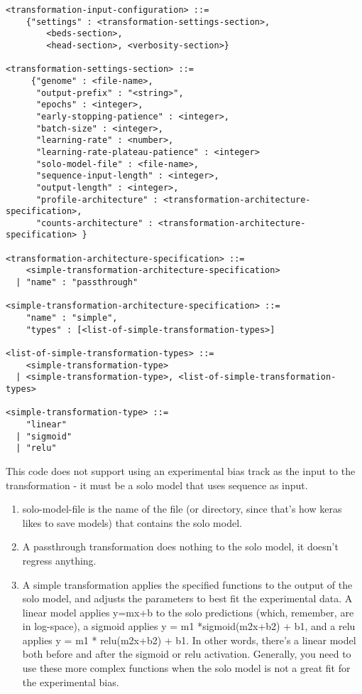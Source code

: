 \documentclass{article}
\begin{document}
\begin{lstlisting}
<transformation-input-configuration> ::=
    {"settings" : <transformation-settings-section>, 
        <beds-section>, 
        <head-section>, <verbosity-section>}

<transformation-settings-section> ::=
     {"genome" : <file-name>,
      "output-prefix" : "<string>", 
      "epochs" : <integer>, 
      "early-stopping-patience" : <integer>, 
      "batch-size" : <integer>, 
      "learning-rate" : <number>,
      "learning-rate-plateau-patience" : <integer> 
      "solo-model-file" : <file-name>,
      "sequence-input-length" : <integer>,
      "output-length" : <integer>,
      "profile-architecture" : <transformation-architecture-specification>, 
      "counts-architecture" : <transformation-architecture-specification> } 

<transformation-architecture-specification> ::= 
    <simple-transformation-architecture-specification>
  | "name" : "passthrough"

<simple-transformation-architecture-specification> ::= 
    "name" : "simple",
    "types" : [<list-of-simple-transformation-types>]

<list-of-simple-transformation-types> ::= 
    <simple-transformation-type>
  | <simple-transformation-type>, <list-of-simple-transformation-types>

<simple-transformation-type> ::= 
    "linear"
  | "sigmoid"
  | "relu"

\end{lstlisting}

This code does not support using an experimental bias track as the input to the 
transformation - it must be a solo model that uses sequence as input.
\begin{enumerate}
    \item solo-model-file is the name of the file (or directory, since that's how keras likes to save models) that contains the solo model. 
    \item A passthrough transformation does nothing to the solo model, it doesn't regress anything. 
    \item A simple transformation applies the specified functions to the output of the solo model, and adjusts the parameters to best fit the experimental data. A linear model applies y=mx+b to the solo predictions (which, remember, are in log-space), a sigmoid applies y = m1 *sigmoid(m2x+b2) + b1, and a relu applies y = m1 * relu(m2x+b2) + b1. In other words, there's a linear model both before and after the sigmoid or relu activation. Generally, you need to use these more complex functions when the solo model is not a great fit for the experimental bias. 
\end{enumerate}
\end{document}
